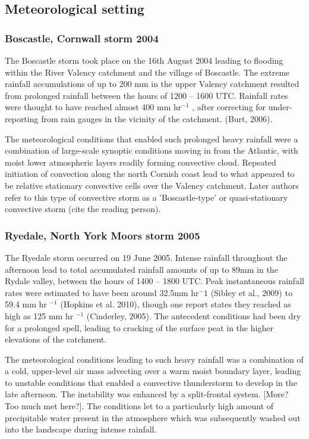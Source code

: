 \documentclass[12pt,oneside,PhD]{muthesis}
\begin{document}
\subsection{Meteorological setting}

\subsubsection{Boscastle, Cornwall storm 2004}
The Boscastle storm took place on the 16th August 2004 leading to flooding within the River Valency catchment and the village of Boscastle. The extreme rainfall accumulations of up to 200 mm in the upper Valency catchment resulted from prolonged rainfall between the hours of 1200 -- 1600 UTC. Rainfall rates were thought to have reached almost 400 mm hr\(^{-1}\) \citep{Golding2006}, after correcting for under-reporting from rain gauges in the vicinity of the catchment. (Burt, 2006).

The meteorological conditions that enabled such prolonged heavy rainfall were a combination of large-scale synoptic conditions moving in from the Atlantic, with moist lower atmospheric layers readily forming convective cloud. Repeated initiation of convection along the north Cornish coast lead to what appeared to be relative stationary convective cells over the Valency catchment. Later authors refer to this type of convective storm as a 'Boscastle-type' or quasi-stationary convective storm (cite the reading person).

\subsubsection{Ryedale, North York Moors storm 2005}
The Ryedale storm occurred on 19 June 2005. Intense rainfall throughout the afternoon lead to total accumulated rainfall amounts of up to 89mm in the Rydale valley, between the hours of 1400 -- 1800 UTC. Peak instantaneous rainfall rates were estimated to have been around 32.5mm hr\(^-1\) (Sibley et al., 2009) to 59.4 mm hr \(^{-1}\) (Hopkins et al. 2010), though one report states they reached as high as 125 mm hr \(^{-1}\) (Cinderley, 2005). The antecedent conditions had been dry for a prolonged spell, leading to cracking of the surface peat in the higher elevations of the catchment.

The meteorological conditions leading to such heavy rainfall was a combination of a cold, upper-level air mass advecting over a warm moist boundary layer, leading to unstable conditions that enabled a convective thunderstorm to develop in the late afternoon. The instability was enhanced by a split-frontal system. [More? Too much met here?]. The conditions let to a particularly high amount of precipitable water present in the atmosphere which was subsequently washed out into the landscape during intense rainfall. 
\end{document}

